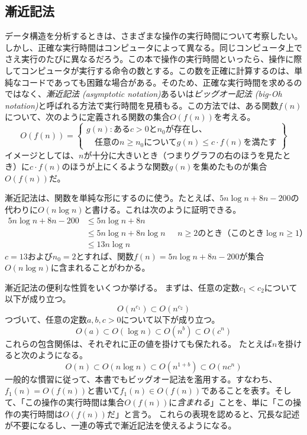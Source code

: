 \subsection{漸近記法}

  
データ構造を分析するときは、さまざまな操作の実行時間について考察したい。しかし、正確な実行時間はコンピュータによって異なる。同じコンピュータ上でさえ実行のたびに異なるだろう。この本で操作の実行時間といったら、操作に際してコンピュータが実行する命令の数とする。この数を正確に計算するのは、単純なコードであっても困難な場合がある。そのため、正確な実行時間を求めるのではなく、\emph{漸近記法 (asymptotic notation)}あるいは\emph{ビッグオー記法 (big-Oh notation)}と呼ばれる方法で実行時間を見積もる。この方法では、ある関数$f(n)$について、次のように定義される関数の集合$O(f(n))$を考える。%
\[
   O(f(n)) = \left\{
     \begin{array}{l}
       g(n):\mbox{ある$c>0$と$n_0$が存在し、} \\
             \quad\mbox{任意の$n\ge n_0$について$g(n) \le c\cdot f(n)$を満たす}
     \end{array} \right\}
\]
イメージとしては、$n$が十分に大きいとき（つまりグラフの右のほうを見たとき）に$c\cdot f(n)$のほうが上にくるような関数$g(n)$を集めたものが集合$O(f(n))$だ。 %

漸近記法は、関数を単純な形にするのに使う。たとえば、$5n\log n + 8n - 200$の代わりに$O(n \log n)$と書ける。これは次のように証明できる。
\begin{align*}
       5n\log n + 8n - 200
        & \le 5n\log n + 8n \\
        & \le 5n\log n + 8n\log n & \mbox{ $n\ge 2$のとき（このとき$\log n \ge 1$）}
            \\
        & \le 13n\log n
\end{align*}
$c = 13$および$n_0 = 2$とすれば、関数$f(n)= 5n \log n + 8n-200$が集合$O(n \log n)$に含まれることがわかる。

漸近記法の便利な性質をいくつか挙げる。
まずは、任意の定数$c_1 < c_2$について以下が成り立つ。
\[ O(n^{c_1}) \subset O(n^{c_2}) \]
つづいて、任意の定数$ a, b, c> 0 $について以下が成り立つ。
\[ O(a) \subset O(\log n) \subset O(n^{b}) \subset O({c}^n) \]
これらの包含関係は、それぞれに正の値を掛けても保たれる。
たとえば$n$を掛けると次のようになる。
\[ O(n) \subset O(n\log n) \subset O(n^{1+b}) \subset O(n{c}^n) \]
一般的な慣習に従って、本書でもビッグオー記法を濫用する。すなわち、$f_1(n) = O(f(n))$と書いて$f_1(n) \in O(f(n))$であることを表す。そして、「この操作の実行時間は集合$O(f(n))$に\emph{含まれる}」ことを、単に「この操作の実行時間は$O(f(n))$だ」と言う。
これらの表現を認めると、冗長な記述が不要になるし、一連の等式で漸近記法を使えるようになる。

